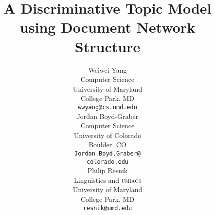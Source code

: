 \documentclass[11pt]{article}
\title{A Discriminative Topic Model using Document Network Structure}
\author{Weiwei Yang\\
  Computer Science \\
  University of Maryland \\
  College Park, MD \\
  {\tt wwyang@cs.umd.edu} \\\And
  Jordan Boyd-Graber \\
  Computer Science \\
  University of Colorado \\
  Boulder, CO \\
  {\tt Jordan.Boyd.Graber@} \\
  {\tt colorado.edu}\\\And
  Philip Resnik \\
  Linguistics and \textsc{umiacs} \\
  University of Maryland \\
  College Park, MD \\
  {\tt resnik@umd.edu} \\
}
\date{}
\newcommand{\sectfile}[1]{}
\begin{document}
\maketitle

\sectfile{00Abstract}

\sectfile{01Introduction}

\sectfile{01.5SBM_RTM}

\sectfile{03Model}

\sectfile{04Inference}

\sectfile{05Experiments}

\sectfile{02Related_Work}

\sectfile{06Conclusions}

\sectfile{Acknowledgement}



\end{document}
